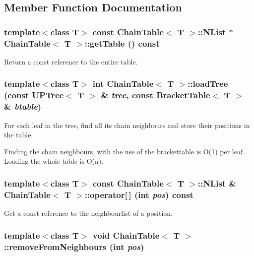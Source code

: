 \subsection{Member Function Documentation}
\subsubsection{\setlength{\rightskip}{0pt plus 5cm}template$<$class T$>$ const {\bf Chain\-Table}$<$ T $>$::{\bf NList} $\ast$ {\bf Chain\-Table}$<$ T $>$::get\-Table () const\hspace{0.3cm}{\tt  [inline]}}\label{classChainTable_a5}


Return a const reference to the entire table. 

\subsubsection{\setlength{\rightskip}{0pt plus 5cm}template$<$class T$>$ int {\bf Chain\-Table}$<$ T $>$::load\-Tree (const {\bf UPTree}$<$ T $>$ \& {\em tree}, const {\bf Bracket\-Table}$<$ T $>$ \& {\em btable})}\label{classChainTable_a4}


For each leaf in the tree, find all its chain neighbours and store their positions in the table. 

Finding the chain neighbours, with the use of the brackettable is O(1) per leaf. Loading the whole table is O(n). 
\subsubsection{\setlength{\rightskip}{0pt plus 5cm}template$<$class T$>$ const {\bf Chain\-Table}$<$ T $>$::{\bf NList} \& {\bf Chain\-Table}$<$ T $>$::operator[$\,$] (int {\em pos}) const\hspace{0.3cm}{\tt  [inline]}}\label{classChainTable_a9}


Get a const reference to the neighbourlist of a position. 

\subsubsection{\setlength{\rightskip}{0pt plus 5cm}template$<$class T$>$ void {\bf Chain\-Table}$<$ T $>$::remove\-From\-Neighbours (int {\em pos})}\label{classChainTable_a8}


